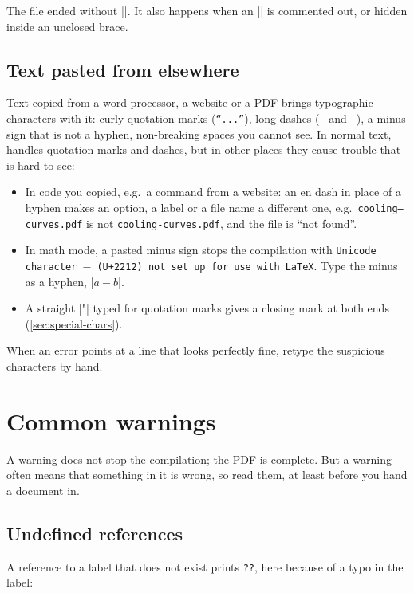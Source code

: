 The file ended without \code||.
It also happens when an \code|| is commented out, or hidden inside an unclosed brace.

\subsection{Text pasted from elsewhere}\label{sec:pasted}

Text copied from a word processor, a website or a PDF brings typographic characters with it:
curly quotation marks (\texttt{“...”}), long dashes (\texttt{–} and \texttt{—}),
a minus sign that is not a hyphen, non-breaking spaces you cannot see.
In normal text,  handles quotation marks and dashes,
but in other places they cause trouble that is hard to see:

\begin{itemize}
    \item In code you copied, e.g.\ a command from a website:
        an en dash in place of a hyphen makes an option, a label or a file name a different one,
        e.g.\ \texttt{cooling–curves.pdf} is not \texttt{cooling-curves.pdf}, and the file is \enquote{not found}.
    \item In math mode, a pasted minus sign stops the compilation with
        \texttt{Unicode character $-$ (U+2212) not set up for use with LaTeX}.
        Type the minus as a hyphen, \code|$a - b$|.
    \item A straight \code|"| typed for quotation marks gives a closing mark at both ends (\autoref{sec:special-chars}).
\end{itemize}

When an error points at a line that looks perfectly fine, retype the suspicious characters by hand.

\section{Common warnings}\label{sec:common-warnings}

A warning does not stop the compilation; the PDF is complete.
But a warning often means that something in it is wrong,
so read them, at least before you hand a document in.

\subsection{Undefined references}\label{sec:undefined-refs}

A reference to a label that does not exist prints \texttt{??},
here because of a typo in the label:

